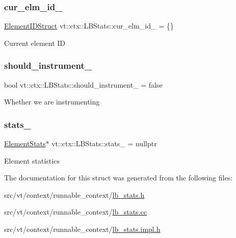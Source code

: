 \subsubsection{\texorpdfstring{cur\+\_\+elm\+\_\+id\+\_\+}{cur\_elm\_id\_}}
{\footnotesize\ttfamily \hyperlink{structvt_1_1ctx_1_1_l_b_stats_a2ba0297a3c99e495b74b73abbf888bde}{Element\+I\+D\+Struct} vt\+::ctx\+::\+L\+B\+Stats\+::cur\+\_\+elm\+\_\+id\+\_\+ = \{\}\hspace{0.3cm}{\ttfamily [private]}}

Current element ID \mbox{\label{structvt_1_1ctx_1_1_l_b_stats_ace63b8b294d303b5055a78a07ede6f5c}} 
\subsubsection{\texorpdfstring{should\+\_\+instrument\+\_\+}{should\_instrument\_}}
{\footnotesize\ttfamily bool vt\+::ctx\+::\+L\+B\+Stats\+::should\+\_\+instrument\+\_\+ = false\hspace{0.3cm}{\ttfamily [private]}}

Whether we are instrumenting \mbox{\label{structvt_1_1ctx_1_1_l_b_stats_a3cbfd8600aa3ba4284e3d2a6c4c7f07a}} 
\subsubsection{\texorpdfstring{stats\+\_\+}{stats\_}}
{\footnotesize\ttfamily \hyperlink{structvt_1_1ctx_1_1_l_b_stats_ae1eb05f8cd4ad63a08ff3cf87ef34e1d}{Element\+Stats}$\ast$ vt\+::ctx\+::\+L\+B\+Stats\+::stats\+\_\+ = nullptr\hspace{0.3cm}{\ttfamily [private]}}

Element statistics 

The documentation for this struct was generated from the following files\+:\begin{DoxyCompactItemize}
\item 
src/vt/context/runnable\+\_\+context/\hyperlink{lb__stats_8h}{lb\+\_\+stats.\+h}\item 
src/vt/context/runnable\+\_\+context/\hyperlink{lb__stats_8cc}{lb\+\_\+stats.\+cc}\item 
src/vt/context/runnable\+\_\+context/\hyperlink{lb__stats_8impl_8h}{lb\+\_\+stats.\+impl.\+h}\end{DoxyCompactItemize}
